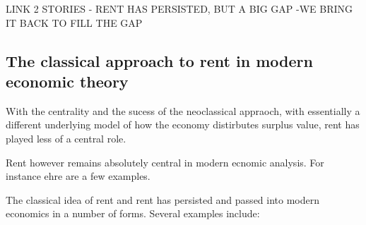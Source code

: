 





LINK 2 STORIES - RENT HAS PERSISTED, BUT A BIG GAP -WE BRING IT BACK TO FILL THE GAP


\subsection{The classical approach to rent in modern economic theory}

With the centrality  and the sucess of the neoclassical appraoch, with essentially a different underlying model of how the economy distirbutes surplus value, rent has played less of a central role.

Rent however remains absolutely central in modern ecnomic analysis. For instance ehre are a few examples.

The classical idea of rent and rent has persisted and passed into modern economics in a number of forms. Several examples include: %


